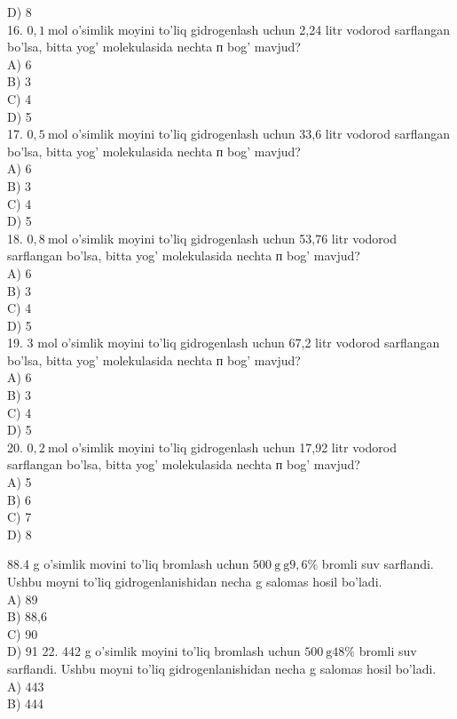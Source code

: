 D) 8\\
16. $0,1 \mathrm{~mol}$ o'simlik moyini to'liq gidrogenlash uchun 2,24 litr vodorod sarflangan bo'lsa, bitta yog' molekulasida nechta п bog' mavjud?\\
A) 6\\
B) 3\\
C) 4\\
D) 5\\
17. $0,5 \mathrm{~mol}$ o'simlik moyini to'liq gidrogenlash uchun 33,6 litr vodorod sarflangan bo'lsa, bitta yog' molekulasida nechta $п$ bog' mavjud?\\
A) 6\\
B) 3\\
C) 4\\
D) 5\\
18. $0,8 \mathrm{~mol}$ o'simlik moyini to'liq gidrogenlash uchun 53,76 litr vodorod sarflangan bo'lsa, bitta yog' molekulasida nechta п bog' mavjud?\\
A) 6\\
B) 3\\
C) 4\\
D) 5\\
19. 3 mol o'simlik moyini to'liq gidrogenlash uchun 67,2 litr vodorod sarflangan bo'lsa, bitta yog' molekulasida nechta п bog' mavjud?\\
A) 6\\
B) 3\\
C) 4\\
D) 5\\
20. $0,2 \mathrm{~mol}$ o'simlik moyini to'liq gidrogenlash uchun 17,92 litr vodorod sarflangan bo'lsa, bitta yog' molekulasida nechta п bog' mavjud?\\
A) 5\\
B) 6\\
C) 7\\
D) 8
  \item 88.4 g o'simlik movini to'liq bromlash uchun $500 \mathrm{~g} \mathrm{~g} 9,6 \%$ bromli suv sarflandi. Ushbu moyni to'liq gidrogenlanishidan necha g salomas hosil bo'ladi.\\
A) 89\\
B) 88,6\\
C) 90\\
D) 91
22. 442 g o'simlik moyini to'liq bromlash uchun $500 \mathrm{~g} 48 \%$ bromli suv sarflandi. Ushbu moyni to'liq gidrogenlanishidan necha g salomas hosil bo'ladi.\\
A) 443\\
B) 444\\
